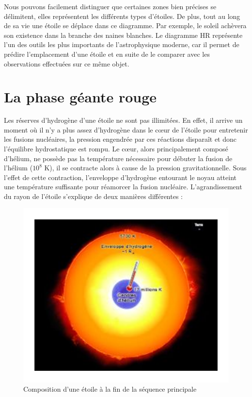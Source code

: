 Nous pouvons facilement distinguer que certaines zones bien précises se délimitent, elles représentent les différents types d’étoiles. De plus, tout au long de sa vie une étoile se déplace dans ce diagramme. Par exemple, le soleil achèvera son existence dans la branche des naines blanches. Le diagramme HR représente l’un des outils les plus importants de l’astrophysique moderne, car il permet de prédire l’emplacement d’une étoile et en suite de le comparer avec les observations effectuées sur ce même objet.\bigskip

\section{La phase géante rouge}

Les réserves d’hydrogène d’une étoile ne sont pas illimitées. En effet, il arrive un moment où il n’y a plus assez d’hydrogène dans le cœur de l’étoile pour entretenir les fusions nucléaires, la pression engendrée par ces réactions disparaît et donc l’équilibre hydrostatique est rompu. Le cœur, alors principalement composé d’hélium, ne possède pas la température nécessaire pour débuter la fusion de l’hélium ($10^{8}$ K), il se contracte alors à cause de la pression gravitationnelle. Sous l’effet de cette contraction, l’enveloppe d’hydrogène entourant le noyau atteint une température suffisante pour réamorcer la fusion nucléaire. L’agrandissement du rayon de l’étoile s’explique de deux manières différentes :

\begin{figure}[H]\vspace{1cm}
	\centering
	\includegraphics[scale=0.6]{images/compo-fin-sq}
	\caption{Composition d'une étoile à la fin de la séquence principale}
\end{figure}\bigskip                         

